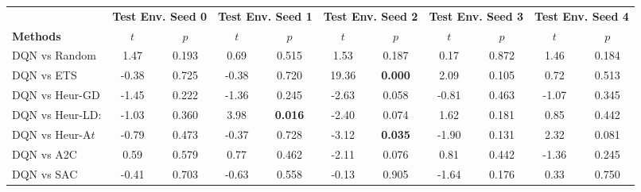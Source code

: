 \begin{tabular}{lcccccccccc}
	\toprule 
	& \multicolumn{2}{c}{\textbf{Test Env. Seed 0}} & \multicolumn{2}{c}{\textbf{Test Env. Seed 1}} & \multicolumn{2}{c}{\textbf{Test Env. Seed 2}} & \multicolumn{2}{c}{\textbf{Test Env. Seed 3}} & \multicolumn{2}{c}{\textbf{Test Env. Seed 4}} \\
	\cmidrule(lr){2-3} \cmidrule(lr){4-5} \cmidrule(lr){6-7} \cmidrule(lr){8-9} \cmidrule(lr){10-11}
	\textbf{Methods} & $t$              & $p$                         & $t$              & $p$                         & $t$               & $p$                        & $t$               & $p$                        & $t$               & $p$                        \\
	\midrule 
	DQN vs Random    & 1.47          & 0.193                  & 0.69          & 0.515                  & 1.53           & 0.187                 & 0.17           & 0.872                 & 1.46           & 0.184                 \\
	DQN vs ETS       & -0.38         & 0.725                  & -0.38         & 0.720                  & 19.36          & \textbf{0.000}        & 2.09           & 0.105                 & 0.72           & 0.513                 \\
	DQN vs Heur-GD   & -1.45         & 0.222                  & -1.36         & 0.245                  & -2.63          & 0.058                 & -0.81          & 0.463                 & -1.07          & 0.345                 \\
	DQN vs Heur-LD:  & -1.03         & 0.360                  & 3.98          & \textbf{0.016}         & -2.40          & 0.074                 & 1.62           & 0.181                 & 0.85           & 0.442                 \\
	DQN vs Heur-A$t$  & -0.79         & 0.473                  & -0.37         & 0.728                  & -3.12          & \textbf{0.035}        & -1.90          & 0.131                 & 2.32           & 0.081                 \\
	DQN vs A2C       & 0.59          & 0.579                  & 0.77          & 0.462                  & -2.11          & 0.076                 & 0.81           & 0.442                 & -1.36          & 0.245                 \\
	DQN vs SAC       & -0.41         & 0.703                  & -0.63         & 0.558                  & -0.13          & 0.905                 & -1.64          & 0.176                 & 0.33           & 0.750                 \\

\end{tabular}
